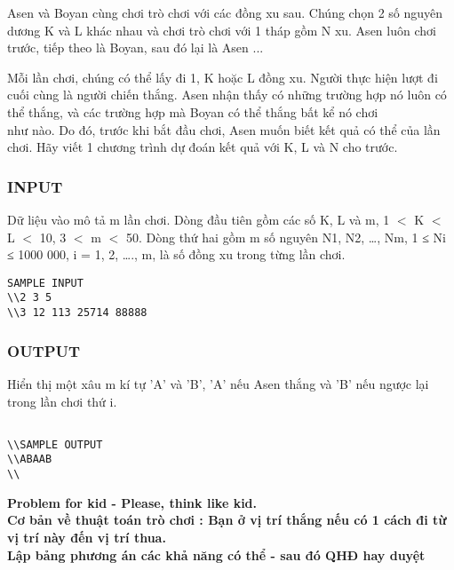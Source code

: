 







   Asen và Boyan cùng chơi trò chơi với các đồng xu sau. Chúng chọn 2 số nguyên dương K và L khác nhau và chơi trò chơi với 1 tháp gồm N xu. Asen luôn chơi trước, tiếp theo là Boyan, sau đó lại là Asen ...  

   Mỗi lần chơi, chúng có thể lấy đi 1, K hoặc L đồng xu. Người thực hiện lượt đi cuối cùng là người chiến thắng. Asen  nhận thấy có những trường hợp nó luôn có thể thắng, và các trường hợp mà Boyan có thể thắng bất kể nó chơi   
\\   như nào. Do đó, trước khi bắt đầu chơi, Asen muốn biết kết quả có thể của lần chơi. Hãy viết 1 chương trình dự đoán kết quả với K, L và N cho trước.  

\subsubsection{   INPUT  }

   Dữ liệu vào mô tả m lần chơi. Dòng đầu tiên gồm các số  K, L và m, 1 $<$ K $<$ L $<$ 10, 3 $<$ m $<$ 50. Dòng thứ hai gồm m số nguyên N1, N2, …, Nm, 1 ≤ Ni ≤ 1000 000,  i = 1, 2, …., m, là số đồng xu trong từng lần chơi.  
\begin{verbatim}
SAMPLE INPUT
\\2 3 5 
\\3 12 113 25714 88888\end{verbatim}

\subsubsection{   OUTPUT  }

   Hiển thị một xâu m kí tự 'A' và 'B', 'A' nếu Asen thắng và 'B' nếu ngược lại trong lần chơi thứ i.  
\begin{verbatim}

\\SAMPLE OUTPUT
\\ABAAB
\\\end{verbatim}

\textbf{    Problem for kid - Please, think like kid.   }
\\\textbf{    Cơ bản về thuật toán trò chơi : Bạn ở vị trí thắng nếu có 1 cách đi từ vị trí này đến vị trí thua.   }
\\\textbf{    Lập bảng phương án các khả năng có thể - sau đó QHĐ hay duyệt   }

